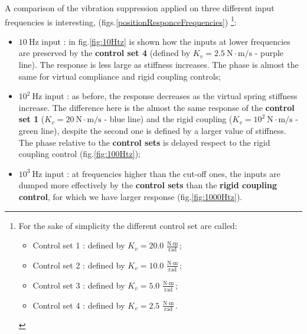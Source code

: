 A comparison of the vibration suppression applied on three
different input frequencies is interesting, (figs.\ref{positionResponceFrequencies})
\footnote{For the sake of simplicity the different control set are called:
	\begin{itemize}
		\item Control set 1 : defined by $ K_v = 20.0 \ \frac{\text{N} \cdot \text{m}}{\text{rad}}$;
		\item Control set 2 : defined by $ K_v = 10.0 \ \frac{\text{N} \cdot \text{m}}{\text{rad}}$;
		\item Control set 3 : defined by $ K_v = 5.0 \ \frac{\text{N} \cdot \text{m}}{\text{rad}}$;
		\item Control set 4 : defined by $ K_v = 2.5 \ \frac{\text{N} \cdot \text{m}}{\text{rad}}$.	
\end{itemize}
}:

\begin{itemize}
\item $ 10 \ \text{Hz} $ input : in fig.\ref{fig:10Htz} is shown how the inputs at lower frequencies are preserved by the \textbf{control set 4} (defined by $ K_v = 2.5 \ \text{N}\cdot\text{m/s} $ - purple line). The response is less large as stiffness increases. The phase is almost the same for virtual compliance and rigid coupling controls;
\item $10^{2} \ \text{Hz}$ input : as before, the response decreases as the virtual spring stiffness increase. The difference here is the almost the same response of the \textbf{control set 1} ($ K_v = 20 \ \text{N}\cdot\text{m/s} $ - blue line) and the rigid coupling ($ K_v = 10^2 \ \text{N}\cdot\text{m/s} $ - green line), despite the second one is defined by a larger value of stiffness. The phase relative to the \textbf{control sets} is delayed respect to the rigid coupling control (fig.\ref{fig:100Htz});
\item $10^{3} \ \text{Hz}$ input : at frequencies higher than the cut-off ones, the
inputs are dumped more effectively by the \textbf{control sets} than the \textbf{rigid coupling control}, for which we have larger response (fig.\ref{fig:1000Htz}).
\end{itemize}

